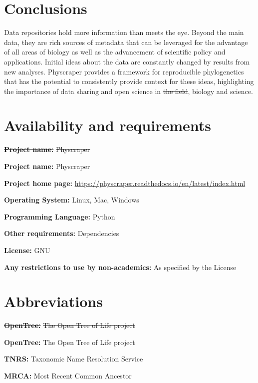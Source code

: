 \documentclass{bmcart}
\providecommand{\DIFaddtex}[1]{{\protect\color{blue}\uwave{#1}}} %
\providecommand{\DIFdeltex}[1]{{\protect\color{red}\sout{#1}}}                      %
\providecommand{\DIFaddbegin}{} %
\providecommand{\DIFaddend}{} %
\providecommand{\DIFdelbegin}{} %
\providecommand{\DIFdelend}{} %
\providecommand{\DIFadd}[1]{\texorpdfstring{\DIFaddtex{#1}}{#1}} %
\providecommand{\DIFdel}[1]{\texorpdfstring{\DIFdeltex{#1}}{}} %
\begin{document}
\section*{Conclusions}
Data repositories hold more information than meets the eye.
Beyond the main data, they are rich sources of metadata that can be leveraged
for the advantage of all areas of biology as well as the advancement of scientific
policy and applications.
Initial ideas about the data are constantly changed by results from new analyses.
Physcraper provides a framework for reproducible phylogenetics that has the
potential to consistently provide context for these ideas, highlighting the
importance of data sharing and open science in \DIFdelbegin \DIFdel{the field}\DIFdelend \DIFaddbegin \DIFadd{phylogenetics}\DIFaddend , biology and science.

\section*{Availability and requirements}

\DIFdelbegin \textbf{\DIFdel{Project name:}} %
\DIFdel{Physcraper
}\DIFdelend \DIFaddbegin \par{\textbf{Project name:} Physcraper}
\DIFaddend 

\textbf{Project home page:} \href{https://physcraper.readthedocs.io/en/latest/index.html}{https://physcraper.readthedocs.io/en/latest/index.html}

\textbf{Operating System:} Linux, Mac, Windows

\textbf{Programming Language:} Python

\textbf{Other requirements:} Dependencies

\textbf{License:} GNU

\textbf{Any restrictions to use by non-academics:} As specified by the License

\section*{Abbreviations}

\DIFdelbegin \textbf{\DIFdel{OpenTree:}} %
\DIFdel{The Open Tree of Life project
}\DIFdelend \DIFaddbegin \par{\textbf{OpenTree:} The Open Tree of Life project}
\DIFaddend 

\textbf{TNRS:} Taxonomic Name Resolution Service

\textbf{MRCA:} Most Recent Common Ancestor
\end{document}
